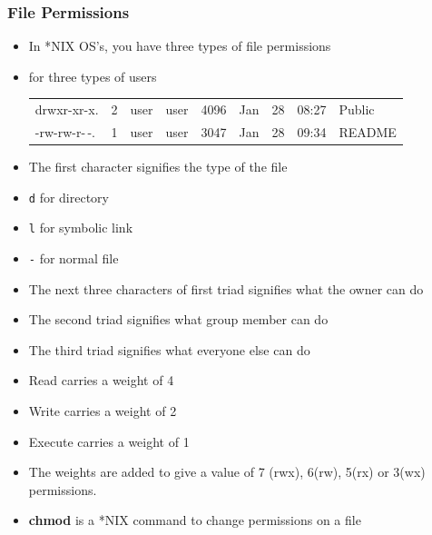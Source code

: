 \documentclass[slidestop,mathserif,compress,xcolor=svgnames]{beamer}
\newenvironment{eblock}[0]
{
\begin{beamerboxesrounded}[upper=uppercol2,lower=lowercol2,shadow=true]}
{\end{beamerboxesrounded}}
\begin{document}
\begin{frame}
  \frametitle{\small File Permissions}
  \begin{itemize}
    \item In *NIX OS's, you have three types of file permissions
    \item for three types of users
    \begin{eblock}{}
      \begin{tabular}{lllllllll}
        drwxr-xr-x. & 2 & user & user & 4096 & Jan & 28 & 08:27 & Public\\
        -rw-rw-r-\,-. & 1 & user & user & 3047 & Jan & 28 & 09:34 & README\\
      \end{tabular}
    \end{eblock}
    \item The first character signifies the type of the file
    \item[] \texttt{d} for directory
    \item[] \texttt{l} for symbolic link
    \item[] \texttt{-} for normal file
    \item The next three characters of first triad signifies what the owner can do
    \item The second triad signifies what group member can do
    \item The third triad signifies what everyone else can do
    \item Read carries a weight of 4
    \item Write carries a weight of 2
    \item Execute carries a weight of 1
    \item The weights are added to give a value of 7 (rwx), 6(rw), 5(rx) or 3(wx) permissions. 
    \item \textbf{chmod} is a *NIX command to change permissions on a file

\end{itemize}
\end{frame}
\end{document}
